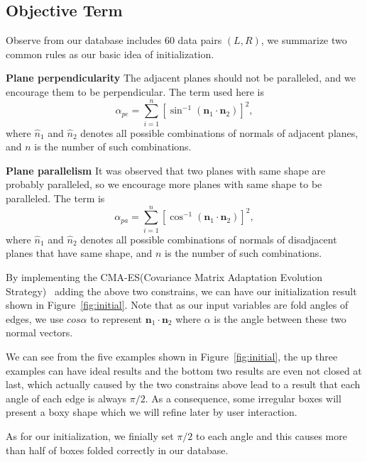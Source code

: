 \documentclass[submission]{gmp2018}
\begin{document}
\subsection{Objective Term}
Observe from our database includes 60 data pairs $(L,R)$, we summarize two common rules as our basic idea of initialization.

\noindent
\textbf{Plane perpendicularity} The adjacent planes should not be paralleled, and we encourage them to be perpendicular. The term used here is
\begin{equation}
\alpha_{pe} = \sum_{i = 1}^{n} [\sin^{-1}(\mathbf{n}_1 \cdot \mathbf{n}_2)]^{2},
\label{equ:perp}
\end{equation}
where $\hat{n}_1$ and $\hat{n}_2$ denotes all possible combinations of normals of adjacent planes, and $n$ is the number of such combinations.

\noindent
\textbf{Plane parallelism} It was observed that two planes with same shape are probably paralleled, so we encourage more planes with same shape to be paralleled. The term is
\begin{equation}
\alpha_{pa} = \sum_{i = 1}^{n} [\cos^{-1}(\mathbf{n}_1 \cdot \mathbf{n}_2)]^{2},
\label{equ:para}
\end{equation}
where $\hat{n}_1$ and $\hat{n}_2$ denotes all possible combinations of normals of disadjacent planes that have same shape,  and $n$ is the number of such combinations.

By implementing the CMA-ES(Covariance Matrix Adaptation Evolution Strategy)~\cite{CMAES} adding the above two constrains, we can have our initialization result shown in Figure~\ref{fig:initial}. Note that as our input variables are fold angles of edges, we use $cos\alpha$ to represent $\mathbf{n}_1 \cdot \mathbf{n}_2$ where $\alpha$ is the angle between these two normal vectors. 

We can see from the five examples shown in Figure~\ref{fig:initial}, the up three examples can have ideal results and the bottom two results are even not closed at last, which actually caused by the two constrains above lead to a result that each angle of each edge is always $\pi/2$. As a consequence, some irregular boxes will present a boxy shape which we will refine later by user interaction.

As for our initialization, we finially set $\pi/2$ to each angle and this causes more than half of boxes folded correctly in our database.
\end{document}
